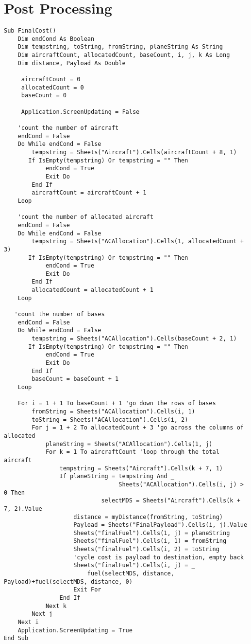 \section{Post Processing}
\begin{lstlisting}
Sub FinalCost()
    Dim endCond As Boolean
    Dim tempstring, toString, fromString, planeString As String
    Dim aircraftCount, allocatedCount, baseCount, i, j, k As Long
    Dim distance, Payload As Double
      
     aircraftCount = 0
     allocatedCount = 0
     baseCount = 0
     
     Application.ScreenUpdating = False
    
    'count the number of aircraft
    endCond = False
    Do While endCond = False
        tempstring = Sheets("Aircraft").Cells(aircraftCount + 8, 1)
       If IsEmpty(tempstring) Or tempstring = "" Then
            endCond = True
            Exit Do
        End If
        aircraftCount = aircraftCount + 1
    Loop
    
    'count the number of allocated aircraft
    endCond = False
    Do While endCond = False
        tempstring = Sheets("ACAllocation").Cells(1, allocatedCount + 3)
       If IsEmpty(tempstring) Or tempstring = "" Then
            endCond = True
            Exit Do
        End If
        allocatedCount = allocatedCount + 1
    Loop
    
   'count the number of bases
    endCond = False
    Do While endCond = False
        tempstring = Sheets("ACAllocation").Cells(baseCount + 2, 1)
       If IsEmpty(tempstring) Or tempstring = "" Then
            endCond = True
            Exit Do
        End If
        baseCount = baseCount + 1
    Loop
    
    For i = 1 + 1 To baseCount + 1 'go down the rows of bases
        fromString = Sheets("ACAllocation").Cells(i, 1)
        toString = Sheets("ACAllocation").Cells(i, 2)
        For j = 1 + 2 To allocatedCount + 3 'go across the columns of allocated
            planeString = Sheets("ACAllocation").Cells(1, j)
            For k = 1 To aircraftCount 'loop through the total aircraft
                tempstring = Sheets("Aircraft").Cells(k + 7, 1)
                If planeString = tempstring And _ 
                                 Sheets("ACAllocation").Cells(i, j) > 0 Then
                            selectMDS = Sheets("Aircraft").Cells(k + 7, 2).Value
                    distance = myDistance(fromString, toString)
                    Payload = Sheets("FinalPayload").Cells(i, j).Value
                    Sheets("finalFuel").Cells(1, j) = planeString
                    Sheets("finalFuel").Cells(i, 1) = fromString
                    Sheets("finalFuel").Cells(i, 2) = toString
                    'cycle cost is payload to destination, empty back
                    Sheets("finalFuel").Cells(i, j) = _
                        fuel(selectMDS, distance, Payload)+fuel(selectMDS, distance, 0)
                    Exit For
                End If
            Next k
        Next j
    Next i
    Application.ScreenUpdating = True
End Sub
\end{lstlisting}